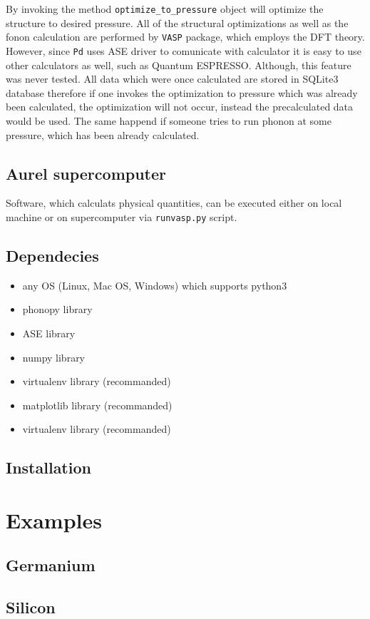 \documentclass[12pt]{article}
\begin{document}
By invoking the method \texttt{optimize\_to\_pressure}  object will optimize the structure to desired pressure. All of the structural optimizations as well as the fonon calculation are performed by \texttt{VASP}\cite{vasp} package, which employs the DFT theory. However, since \texttt{Pd} uses ASE driver to comunicate with calculator it is easy to use other calculators as well, such as Quantum ESPRESSO\cite{QE}. Although, this feature was never tested. All data which were once calculated are stored in SQLite3 database\cite{SQL} therefore if one invokes the optimization to pressure which was already been calculated, the optimization will not occur, instead the precalculated data would be used. The same happend if someone tries to run phonon at some pressure, which has been already calculated. 

\subsection{Aurel supercomputer}

Software, which calculats physical quantities, can be executed either on local machine or on supercomputer via \texttt{runvasp.py} script.

\subsection{Dependecies}\label{deps}

\begin{itemize}
  \item any OS (Linux, Mac OS, Windows) which supports python3
  \item phonopy library
  \item ASE library
  \item numpy library
  \item virtualenv library (recommanded)
  \item matplotlib library (recommanded)
  \item virtualenv library (recommanded)
\end{itemize}

\subsection{Installation}

\section{Examples}

\subsection{Germanium}

\subsection{Silicon}

\printbibliography
\end{document}
